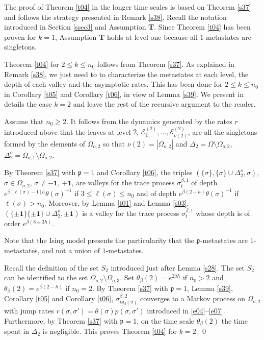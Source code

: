 \documentclass[reqno]{amsart}
\begin{document}
The proof of Theorem \ref{t04} in the longer time scales is based on
Theorem \ref{s37} and follows the strategy presented in Remark
\ref{s38}. Recall the notation introduced in Section \ref{ssec3} and
Assumption {\bf T}. Since Theorem \ref{t04} has been proven for $k=1$,
Assumption {\bf T} holds at level one because all $1$-metastates are
singletons.

Theorem \ref{t04} for $2\le k\le n_0$ follows from Theorem
\ref{s37}. As explained in Remark \ref{s38}, we just need to to
characterize the metastates at each level, the depth of each valley
and the asymptotic rates. This has been done for $2\le k\le n_0$ in
Corollary \ref{t05} and Corollary \ref{t06}, in view of Lemma
\ref{s39}. We present in details the case $k=2$ and leave the rest of
the recursive argument to the reader.

Assume that $n_0\ge 2$. It follows from the dynamics generated by the
rates $r$ introduced above that the leaves at level $2$, ${{\mathcal E}}^{(2)}_1, \dots, {{\mathcal E}}^{(2)}_{\nu(2)}$, are all the singletons formed
by the elements of $\Omega_{o,2}$ so that $\nu(2) = |\Omega_{o,2}|$
and $\Delta_2 = \Omega\setminus\Omega_{o,2}$, $\Delta^o_2 =
\Omega_{o,1} \setminus \Omega_{o,2}$.

By Theorem \ref{s37} with ${{\mathfrak p}}=1$ and Corollary \ref{t06}, the
triples $(\{\sigma\}, \{\sigma\}\cup \Delta^o_2, \sigma)$, $\sigma \in
\Omega_{o,2}$, $\sigma \not = -{{\mathbf 1}}$, $+{{\mathbf 1}}$, are valleys for the
trace process $\sigma^{\beta, 1}_t$ of depth $e^{\beta
  [\ell(\sigma)-1]h} \theta(\sigma)^{-1}$ if $3\le \ell(\sigma) \le
n_0$ and of depth $e^{\beta (2-h)} \theta(\sigma)^{-1}$ if
$\ell(\sigma)> n_0$. Moreover, by Lemma \ref{t01} and Lemma \ref{s03},
$(\{\pm {{\mathbf 1}}\} \{\pm {{\mathbf 1}}\}\cup \Delta^o_2, \pm{{\mathbf 1}})$ is a valley
for the trace process $\sigma^{\beta, 1}_t$ whose depth is of order
$e^{\beta (8\pm 3h)}$.

Note that the Ising model presents the particularity that the ${{\mathfrak p}}$-metastates are $1$-metastates, and not a union of $1$-metastates.

Recall the definition of the set $S_2$ introduced just after Lemma
\ref{s28}. The set $S_2$ can be identified to the set $\Omega_{o,2}
\setminus \Omega_{o,3}$. Set $\theta_\beta(2) = e^{2 \beta h}$ if
$n_0>2$ and $\theta_\beta(2) = e^{\beta(2-h)}$ if $n_0=2$. By Theorem
\ref{s37} with ${{\mathfrak p}}=1$, Lemma \ref{s39}, Corollary \ref{t05} and
Corollary \ref{t06}, $\sigma^{\beta,2}_{t \theta_\beta(2)}$ converges
to a Markov process on $\Omega_{o,2}$ with jump rates $r(\sigma,
\sigma') = \theta(\sigma) p(\sigma, \sigma')$ introduced in
\eqref{e04}--\eqref{e07}. Furthermore, by Theorem \ref{s37} with ${{\mathfrak p}}=1$, on the time scale $\theta_\beta(2)$ the time spent in $\Delta_2$
is negligible.  This proves Theorem \ref{t04} for $k=2$. \qed
\smallskip
\end{document}
